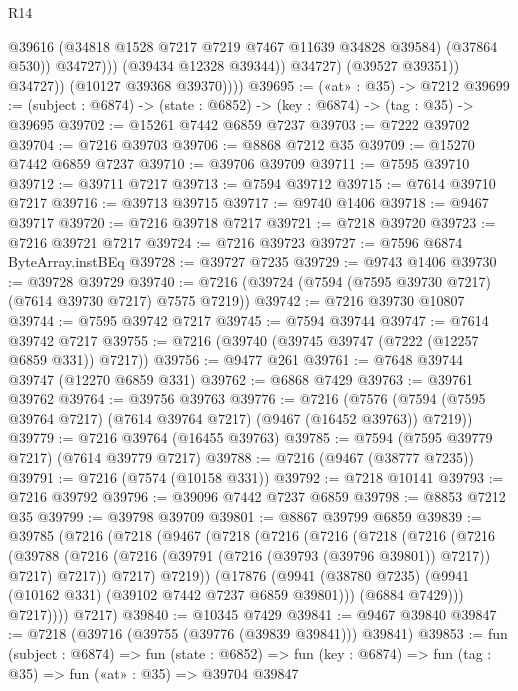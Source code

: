 \begin{lexlean}{R14}
\begin{coremodule}
                            @39616
                            (@34818 @1528 @7217 @7219 @7467 @11639 @34828 @39584)
                            (@37864 @530))
                          @34727)))
                    (@39434 @12328 @39344))
                  @34727)
                (@39527 @39351))
              @34727))
          (@10127 @39368 @39370))))
@39695 := («at» : @35) -> @7212
@39699 := (subject : @6874) -> (state : @6852) -> (key : @6874) -> (tag : @35) -> @39695
@39702 := @15261 @7442 @6859 @7237
@39703 := @7222 @39702
@39704 := @7216 @39703
@39706 := @8868 @7212 @35
@39709 := @15270 @7442 @6859 @7237
@39710 := @39706 @39709
@39711 := @7595 @39710
@39712 := @39711 @7217
@39713 := @7594 @39712
@39715 := @7614 @39710 @7217
@39716 := @39713 @39715
@39717 := @9740 @1406
@39718 := @9467 @39717
@39720 := @7216 @39718 @7217
@39721 := @7218 @39720
@39723 := @7216 @39721 @7217
@39724 := @7216 @39723
@39727 := @7596 @6874 ByteArray.instBEq
@39728 := @39727 @7235
@39729 := @9743 @1406
@39730 := @39728 @39729
@39740 := @7216 (@39724 (@7594 (@7595 @39730 @7217) (@7614 @39730 @7217) @7575 @7219))
@39742 := @7216 @39730 @10807
@39744 := @7595 @39742 @7217
@39745 := @7594 @39744
@39747 := @7614 @39742 @7217
@39755 := @7216 (@39740 (@39745 @39747 (@7222 (@12257 @6859 @331)) @7217))
@39756 := @9477 @261
@39761 := @7648 @39744 @39747 (@12270 @6859 @331)
@39762 := @6868 @7429
@39763 := @39761 @39762
@39764 := @39756 @39763
@39776 := @7216
    (@7576 (@7594 (@7595 @39764 @7217) (@7614 @39764 @7217) (@9467 (@16452 @39763)) @7219))
@39779 := @7216 @39764 (@16455 @39763)
@39785 := @7594 (@7595 @39779 @7217) (@7614 @39779 @7217)
@39788 := @7216 (@9467 (@38777 @7235))
@39791 := @7216 (@7574 (@10158 @331))
@39792 := @7218 @10141
@39793 := @7216 @39792
@39796 := @39096 @7442 @7237 @6859
@39798 := @8853 @7212 @35
@39799 := @39798 @39709
@39801 := @8867 @39799 @6859
@39839 := @39785
    (@7216
      (@7218
        (@9467
          (@7218
            (@7216
              (@7216
                (@7218
                  (@7216
                    (@7216
                      (@39788
                        (@7216 (@7216 (@39791 (@7216 (@39793 (@39796 @39801)) @7217)) @7217) @7217))
                      @7217)
                    @7219))
                (@17876
                  (@9941 (@38780 @7235) (@9941 (@10162 @331) (@39102 @7442 @7237 @6859 @39801)))
                  (@6884 @7429)))
              @7217))))
      @7217)
@39840 := @10345 @7429
@39841 := @9467 @39840
@39847 := @7218 (@39716 (@39755 (@39776 (@39839 @39841))) @39841)
@39853 := fun (subject : @6874) =>
  fun (state : @6852) => fun (key : @6874) => fun (tag : @35) => fun («at» : @35) => @39704 @39847

\end{coremodule}
\end{lexlean}
